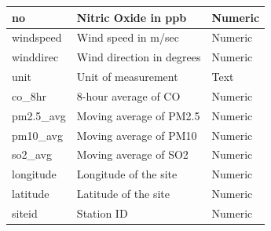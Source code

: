 \documentclass[./report.tex]{subfiles}
\begin{document}
\begin{itemize}
\begin{table}[h!]
\begin{tabular}{|>{\raggedright\arraybackslash}p{3cm}|p{5cm}|p{3cm}|}
\hline
no & Nitric Oxide in ppb & Numeric \\
\hline
windspeed & Wind speed in m/sec & Numeric \\
\hline
winddirec & Wind direction in degrees & Numeric \\
\hline
unit & Unit of measurement & Text \\
\hline
co\_8hr & 8-hour average of CO & Numeric \\
\hline
pm2.5\_avg & Moving average of PM2.5 & Numeric \\
\hline
pm10\_avg & Moving average of PM10 & Numeric \\
\hline
so2\_avg & Moving average of SO2 & Numeric \\
\hline
longitude & Longitude of the site & Numeric \\
\hline
latitude & Latitude of the site & Numeric \\
\hline
siteid & Station ID & Numeric \\
\hline
\end{tabular}
\label{tab:data_columns}
\end{table}
\end{itemize}
\end{document}
